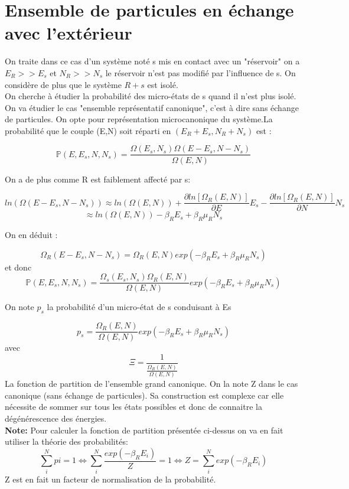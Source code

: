\chapter{Ensemble de particules en échange avec l'extérieur}



On traite dans ce cas d'un système noté s mis en contact avec un "réservoir" on a $E_R >> E_s$ et $N_R >> N_s$ le réservoir n'est pas modifié par l'influence de s. On considère de plus que le système $R + s$ est isolé. \\ 
On cherche à étudier la probabilité des micro-états de s quand il n'est plus isolé. On va étudier le cas "ensemble représentatif canonique", c'est à dire sans échange de particules.
On opte pour représentation microcanonique du système.La probabilité que le couple (E,N) soit réparti en $(E_R +E_s, N_R + N_s)$ est : 


$$ \mathbb{P} (E,E_s,N,N_s) = \frac{\Omega (E_s, N_s) \Omega (E-E_s,N-N_s)}{\Omega (E, N)}$$


On a de plus comme R est faiblement affecté par s:


$$ ln(\Omega (E-E_s,N-N_s)) \approx ln(\Omega (E, N)) + \frac{\partial ln[\Omega_R (E,N)]}{\partial E} E_s - \frac{\partial ln[\Omega_R (E,N)]}{\partial N} N_s $$
$$\approx ln(\Omega (E, N))- \beta_R E_s +\beta_R \mu_R N_s $$

On en déduit :


$$\Omega_R (E-E_s,N-N_s)= \Omega_R (E,N) exp(-\beta_R E_s +\beta_R \mu_R N_s) $$
et donc 
$$ \mathbb{P} (E,E_s,N,N_s) = \frac{\Omega_s (E_s, N_s) \Omega_R (E,N)}{\Omega (E, N)} exp(-\beta_R E_s +\beta_R \mu_R N_s)$$


On note $p_s$ la probabilité d'un micro-état de s conduisant à Es


$$p_s =\frac{\Omega_R (E,N)}{\Omega (E, N)} exp(-\beta_R E_s +\beta_R \mu_R N_s)$$
avec 
$$\Xi =\frac{1}{\frac{\Omega_R (E,N)}{\Omega (E, N)}}$$
La fonction de partition de l'ensemble grand canonique.
On la note Z dans le cas canonique (sans échange de particules).
Sa construction est complexe car elle nécessite de sommer sur tous les états possibles et donc de connaitre la dégénérescence des énergies.\\

\textbf{Note:} Pour calculer la fonction de partition présentée ci-dessus on va en fait utiliser la théorie des probabilités:
$$\sum_i^N pi=1 \Leftrightarrow \sum_i^N \frac{exp(-\beta_R E_i)}{Z}=1 \Leftrightarrow Z= \sum_i^N exp(-\beta_R E_i) $$
Z est en fait un facteur de normalisation de la probabilité.


